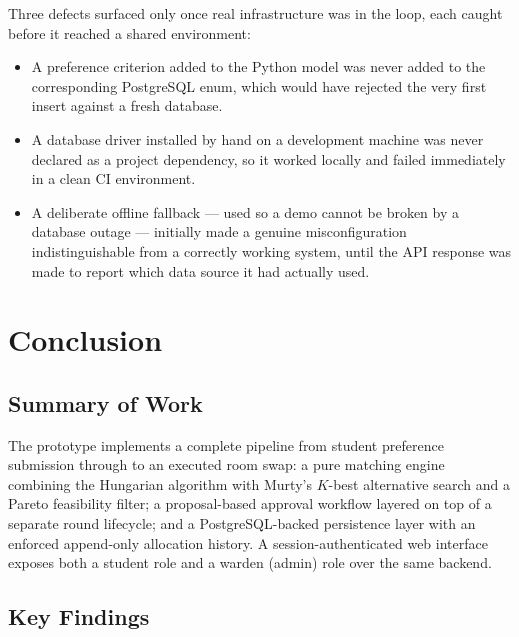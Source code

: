 \documentclass[11pt,a4paper]{report}
\begin{document}
Three defects surfaced only once real infrastructure was in the loop,
each caught before it reached a shared environment:

\begin{itemize}[leftmargin=0.7cm]
    \item A preference criterion added to the Python model was never
    added to the corresponding PostgreSQL enum, which would have
    rejected the very first insert against a fresh database.
    \item A database driver installed by hand on a development
    machine was never declared as a project dependency, so it worked
    locally and failed immediately in a clean CI environment.
    \item A deliberate offline fallback --- used so a demo cannot be
    broken by a database outage --- initially made a genuine
    misconfiguration indistinguishable from a correctly working
    system, until the API response was made to report which data
    source it had actually used.
\end{itemize}


\chapter{Conclusion}

\section{Summary of Work}

The prototype implements a complete pipeline from student preference
submission through to an executed room swap: a pure matching engine
combining the Hungarian algorithm with Murty's $K$-best alternative
search and a Pareto feasibility filter; a proposal-based approval
workflow layered on top of a separate round lifecycle; and a
PostgreSQL-backed persistence layer with an enforced append-only
allocation history. A session-authenticated web interface exposes
both a student role and a warden (admin) role over the same backend.

\section{Key Findings}
\end{document}

